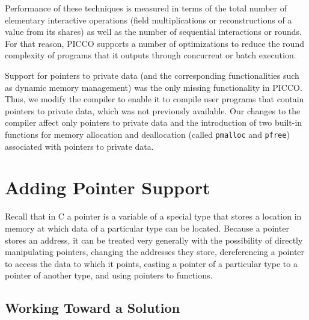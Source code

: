 \documentclass[11pt]{article}
\begin{document}
Performance of these techniques is measured in terms of the total number of
elementary interactive operations (field multiplications or reconstructions
of a value from its shares) as well as the number of sequential interactions or
rounds. For that reason, PICCO supports a number of optimizations to reduce
the round complexity of programs that it outputs through concurrent or
batch execution. 

Support for pointers to private data (and the corresponding functionalities
such as dynamic memory management) was the only missing functionality in
PICCO. Thus, we modify the compiler to enable it to compile user programs
that contain pointers to private data, which was not previously available.
Our changes to the compiler affect only pointers to private data and the
introduction of two built-in functions for memory allocation and
deallocation (called \texttt{pmalloc} and \texttt{pfree}) associated with
pointers to private data.

\section{Adding Pointer Support}
\label{sec3}

Recall that in C a pointer is a variable of a special type that stores a
location in memory at which data of a particular type can be located.
Because a pointer stores an address, it can be treated very generally with
the possibility of directly manipulating pointers, changing the addresses
they store, dereferencing a pointer to access the data to which it points,
casting a pointer of a particular type to a pointer of another type, and
using pointers to functions.

\subsection{Working Toward a Solution}
\end{document}
